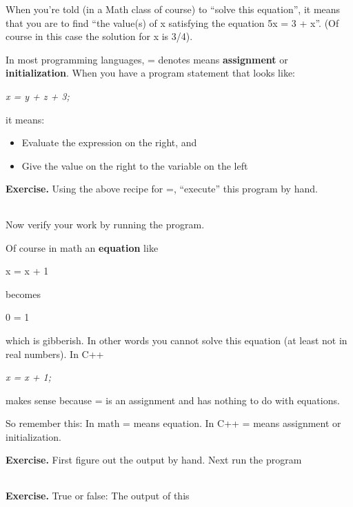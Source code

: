 \documentclass[
]{article}
\providecommand{\tightlist}{%
  \setlength{\itemsep}{0pt}\setlength{\parskip}{0pt}}
\begin{document}
When you're told (in a Math class of course) to ``solve this equation'',
it means that you are to find ``the value(s) of x satisfying the
equation 5x = 3 + x''. (Of course in this case the solution for x is
3/4).

In most programming languages, = denotes means \textbf{assignment} or
\textbf{initialization}. When you have a program statement that looks
like:

\emph{x = y + z + 3;}

it means:

\begin{itemize}
\tightlist
\item
  Evaluate the expression on the right, and
\item
  Give the value on the right to the variable on the left
\end{itemize}

\textbf{Exercise.} Using the above recipe for =, ``execute'' this
program by hand.

\begin{longtable}[]{@{}@{}}
\toprule
\endhead
\bottomrule
\end{longtable}

Now verify your work by running the program.

Of course in math an \textbf{equation} like

x = x + 1

becomes

0 = 1

which is gibberish. In other words you cannot solve this equation (at
least not in real numbers). In C++

\emph{x = x + 1;}

makes sense because = is an assignment and has nothing to do with
equations.

So remember this: In math = means equation. In C++ = means assignment or
initialization.

\textbf{Exercise. }First figure out the output by hand. Next run the
program

\begin{longtable}[]{@{}@{}}
\toprule
\endhead
\bottomrule
\end{longtable}

\textbf{Exercise.} True or false: The output of this

\begin{longtable}[]{@{}@{}}
\toprule
\endhead
\bottomrule
\end{longtable}
\end{document}
